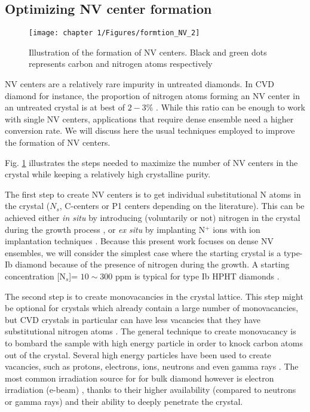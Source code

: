 \documentclass[a4paper, 11pt]{report}
\begin{document}
\subsection{Optimizing NV center formation}
\begin{figure}[h!]
\centering
\texttt{[image: chapter 1/Figures/formtion\_NV\_2]}
\caption{Illustration of the formation of NV centers. Black and green dots represents carbon and nitrogen atoms respectively}
\label{formation NV}
\end{figure}

NV centers are a relatively rare impurity in untreated diamonds. In CVD diamond for instance, the proportion of nitrogen atoms forming an NV center in an untreated crystal is at best of $2-3 \%$ \citep{hartland2014study}. While this ratio can be enough  to work with single NV centers, applications that require dense ensemble need a higher conversion rate. We will discuss here the usual techniques employed to improve the formation of NV centers.

Fig. \ref{formation NV} illustrates the steps needed to maximize the number of NV centers in the crystal while keeping a relatively high crystalline purity.

The first step to create NV centers is to get individual substitutional N atoms in the crystal ($N_s$, C-centers or P1 centers depending on the literature). This can be achieved either \textit{in situ} by introducing (voluntarily or not) nitrogen in the crystal during the growth process \citep{tallaire2006characterisation, lobaev2017influence}, or \textit{ex situ} by implanting N$^+$ ions with ion implantation techniques \citep{meijer2005generation, smith2019colour}. Because this present work focuses on dense NV ensembles, we will consider the simplest case where the starting crystal is a type-Ib diamond because of the presence of nitrogen during the growth. A starting concentration [N$_s$]= $10 \sim 300$ ppm is typical for type Ib HPHT diamonds \citep{achard2020chemical}.

The second step is to create monovacancies in the crystal lattice. This step might be optional for crystals which already contain a large number of monovacancies, but CVD crystals in particular can have less vacancies that they have substitutional nitrogen atoms \citep{mainwood1999point}. The general technique to create monovacancy is to bombard the sample with high energy particle in order to knock carbon atoms out of the crystal. Several high energy particles have been used to create vacancies, such as protons, electrons, ions, neutrons and even gamma rays \citep{davies1976optical, ashbaugh1988gemstone, kleinsasser2016high}. The most common irradiation source for for bulk diamond however is electron irradiation (e-beam) \citep{acosta2009diamonds}, thanks to their higher availability (compared to neutrons or gamma rays) and their ability to deeply penetrate the crystal.
\end{document}
